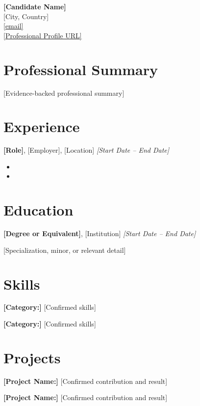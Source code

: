 \documentclass[a4paper,10pt]{article}
\begin{document}
\begin{center}
{\LARGE\textbf{[Candidate Name]}}\\
\vspace{0.15cm}
\small
[City, Country] \\
[Phone] \quad
\href{mailto:[email]}{[email]} \\
\href{[Professional Profile URL]}{[Professional Profile URL]}
\end{center}

\section*{Professional Summary}

[Evidence-backed professional summary]

\section*{Experience}

\textbf{[Role]}, [Employer], [Location]
\hfill
\textit{[Start Date -- End Date]}

\begin{itemize}
\item [Confirmed accomplishment or responsibility]
\item [Confirmed accomplishment or responsibility]
\end{itemize}

\section*{Education}

\textbf{[Degree or Equivalent]}, [Institution]
\hfill
\textit{[Start Date -- End Date]}

[Specialization, minor, or relevant detail]

\section*{Skills}

\textbf{[Category:]} [Confirmed skills]

\textbf{[Category:]} [Confirmed skills]

\section*{Projects}

\textbf{[Project Name:]} [Confirmed contribution and result]

\vspace{0.1cm}

\textbf{[Project Name:]} [Confirmed contribution and result]
\end{document}
